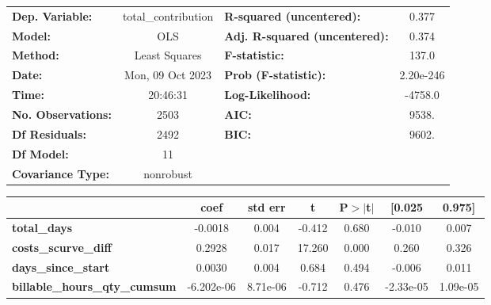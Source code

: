 \begin{center}
\begin{tabular}{lclc}
\toprule
\textbf{Dep. Variable:}               & total\_contribution & \textbf{  R-squared (uncentered):}      &     0.377   \\
\textbf{Model:}                       &         OLS         & \textbf{  Adj. R-squared (uncentered):} &     0.374   \\
\textbf{Method:}                      &    Least Squares    & \textbf{  F-statistic:       }          &     137.0   \\
\textbf{Date:}                        &   Mon, 09 Oct 2023  & \textbf{  Prob (F-statistic):}          & 2.20e-246   \\
\textbf{Time:}                        &       20:46:31      & \textbf{  Log-Likelihood:    }          &   -4758.0   \\
\textbf{No. Observations:}            &          2503       & \textbf{  AIC:               }          &     9538.   \\
\textbf{Df Residuals:}                &          2492       & \textbf{  BIC:               }          &     9602.   \\
\textbf{Df Model:}                    &            11       & \textbf{                     }          &             \\
\textbf{Covariance Type:}             &      nonrobust      & \textbf{                     }          &             \\
\bottomrule
\end{tabular}
\begin{tabular}{lcccccc}
                                      & \textbf{coef} & \textbf{std err} & \textbf{t} & \textbf{P$> |$t$|$} & \textbf{[0.025} & \textbf{0.975]}  \\
\midrule
\textbf{total\_days}                  &      -0.0018  &        0.004     &    -0.412  &         0.680        &       -0.010    &        0.007     \\
\textbf{costs\_scurve\_diff}          &       0.2928  &        0.017     &    17.260  &         0.000        &        0.260    &        0.326     \\
\textbf{days\_since\_start}           &       0.0030  &        0.004     &     0.684  &         0.494        &       -0.006    &        0.011     \\
\textbf{billable\_hours\_qty\_cumsum} &   -6.202e-06  &     8.71e-06     &    -0.712  &         0.476        &    -2.33e-05    &     1.09e-05     \\

\end{tabular}
\end{center}
